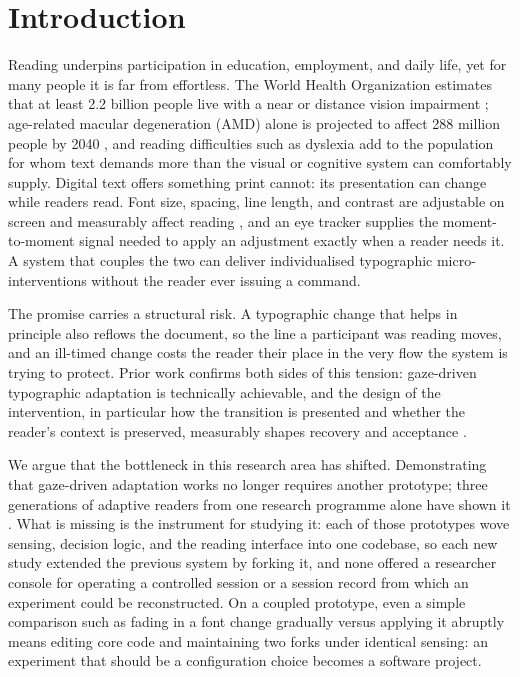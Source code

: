\section{Introduction}
\label{sec:intro}

Reading underpins participation in education, employment, and daily life, yet for many people it is far from effortless.
The World Health Organization estimates that at least 2.2 billion people live with a near or distance vision impairment \cite{who2026vision}; age-related macular degeneration (AMD) alone is projected to affect 288 million people by 2040 \cite{apte2021amd}, and reading difficulties such as dyslexia add to the population for whom text demands more than the visual or cognitive system can comfortably supply.
Digital text offers something print cannot: its presentation can change while readers read.
Font size, spacing, line length, and contrast are adjustable on screen and measurably affect reading \cite{rello2016makeitbig, beymer2008eyetracking, beier2021letterspacing}, and an eye tracker supplies the moment-to-moment signal needed to apply an adjustment exactly when a reader needs it.
A system that couples the two can deliver individualised typographic micro-interventions \cite{persson2025microintervention} without the reader ever issuing a command.

The promise carries a structural risk.
A typographic change that helps in principle also reflows the document, so the line a participant was reading moves, and an ill-timed change costs the reader their place in the very flow the system is trying to protect.
Prior work confirms both sides of this tension: gaze-driven typographic adaptation is technically achievable, and the design of the intervention, in particular how the transition is presented and whether the reader's context is preserved, measurably shapes recovery and acceptance \cite{pereira2024typography, jensen2025context}.

We argue that the bottleneck in this research area has shifted.
Demonstrating that gaze-driven adaptation works no longer requires another prototype; three generations of adaptive readers from one research programme alone have shown it \cite{refsgaard2024rtr, pereira2024typography, palinec2024reactive}.
What is missing is the instrument for studying it: each of those prototypes wove sensing, decision logic, and the reading interface into one codebase, so each new study extended the previous system by forking it, and none offered a researcher console for operating a controlled session or a session record from which an experiment could be reconstructed.
On a coupled prototype, even a simple comparison such as fading in a font change gradually versus applying it abruptly means editing core code and maintaining two forks under identical sensing: an experiment that should be a configuration choice becomes a software project.

